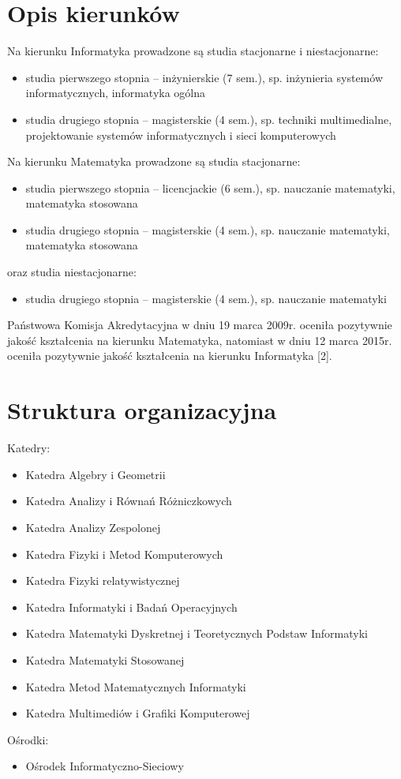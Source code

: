 \documentclass[a4paper,12pt]{article}
\begin{document}
\section{Opis kierunków}
Na kierunku Informatyka prowadzone są studia stacjonarne i niestacjonarne:
\begin{itemize}
\item {studia pierwszego stopnia – inżynierskie (7 sem.), sp. inżynieria systemów informatycznych, informatyka
ogólna}
\item{studia drugiego stopnia – magisterskie (4 sem.), sp. techniki multimedialne, projektowanie systemów
informatycznych i sieci komputerowych}
\end{itemize}
Na kierunku Matematyka prowadzone są studia stacjonarne:
\begin{itemize}
\item{studia pierwszego stopnia – licencjackie (6 sem.), sp. nauczanie matematyki, matematyka stosowana}
\item{studia drugiego stopnia – magisterskie (4 sem.), sp. nauczanie matematyki, matematyka stosowana}
\end{itemize}
oraz studia niestacjonarne:
\begin{itemize}
\item{studia drugiego stopnia – magisterskie (4 sem.), sp. nauczanie matematyki}
\end{itemize}

Państwowa Komisja Akredytacyjna w dniu 19 marca 2009r. oceniła pozytywnie jakość kształcenia na kierunku
Matematyka, natomiast w dniu 12 marca 2015r. oceniła pozytywnie jakość kształcenia na kierunku Informatyka [2].

\section{Struktura organizacyjna}
Katedry:\\
\begin{itemize}
\item{Katedra Algebry i Geometrii}
\item{Katedra Analizy i Równań Różniczkowych}
\item{Katedra Analizy Zespolonej}
\item{Katedra Fizyki i Metod Komputerowych}
\item{Katedra Fizyki relatywistycznej}
\item{Katedra Informatyki i Badań Operacyjnych}
\item{Katedra Matematyki Dyskretnej i Teoretycznych Podstaw Informatyki}
\item{Katedra Matematyki Stosowanej}
\item{Katedra Metod Matematycznych Informatyki}
\item{Katedra Multimediów i Grafiki Komputerowej}

\end{itemize}
Ośrodki:
\begin{itemize}
\item Ośrodek Informatyczno-Sieciowy
\end{itemize}
\end{document}
